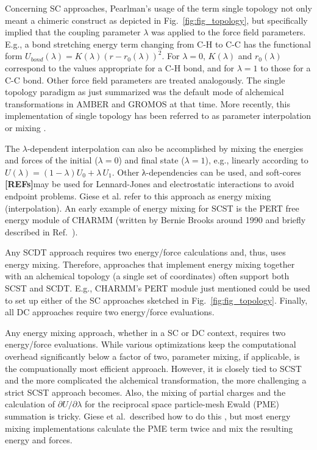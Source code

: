 \documentclass[9pt,bestpractices]{livecoms}
\newcommand{\rref}{{\bfseries[REFs]}{}}
\begin{document}
Concerning SC approaches, Pearlman’s usage of the term single topology not only meant a chimeric construct as depicted in Fig.~\ref{fig:fig_topology}, but specifically implied that the coupling parameter $\lambda$ was applied to the force field parameters. E.g., a bond stretching energy term changing from C-H to C-C has the functional form $U_{bond}(\lambda)=K(\lambda)(r-r_0(\lambda))^2$. For $\lambda=0$, $K(\lambda)$ and $r_0(\lambda)$ correspond to the values appropriate for a C-H bond, and for $\lambda=1$ to those for a C-C bond. Other force field parameters are treated analogously. The single topology paradigm as just summarized was the default mode of alchemical transformations in AMBER and GROMOS at that time.  More recently, this implementation of single topology has been referred to as parameter interpolation or mixing \cite{Giese_2018}. 

The $\lambda$-dependent interpolation can also be accomplished by mixing the energies and forces of the initial ($\lambda=0$) and final state ($\lambda=1$), e.g., linearly according to $U(\lambda)=(1-\lambda) U_0+\lambda\,U_1$. Other λ-dependencies can be used, and soft-cores \rref may be used for Lennard-Jones and electrostatic interactions to avoid endpoint problems. Giese et al. \cite{Giese_2018} refer to this approach as energy mixing (interpolation).%
An early example of energy mixing for SCST is the PERT free energy module of CHARMM (written by Bernie Brooks around 1990 and briefly described in Ref.~\cite{brooks_2009}).

Any SCDT approach requires two energy/force calculations and, thus, uses energy mixing. Therefore, approaches that implement energy mixing together with an alchemical topology (a single set of coordinates) often support both SCST and SCDT. E.g., CHARMM's PERT module just mentioned could be used to set up either of the SC approaches sketched in Fig.~\ref{fig:fig_topology}. Finally, all DC approaches require two energy/force evaluations.

Any energy mixing approach, whether in a SC or DC context, requires two energy/force evaluations. While various optimizations keep the computational overhead significantly below a factor of two,  parameter mixing, if applicable, is the compuationally most efficient approach. However, it is closely tied to SCST and the more complicated the alchemical transformation, the more challenging a strict SCST approach becomes. Also, the mixing of partial charges and the calculation of $\partial U/\partial\lambda$ for the reciprocal space particle-mesh Ewald (PME) summation is tricky. Giese et al.\ described how to do this \cite{Giese_2018}, but most energy mixing implementations calculate the PME term twice and mix the resulting energy and forces.
\end{document}
